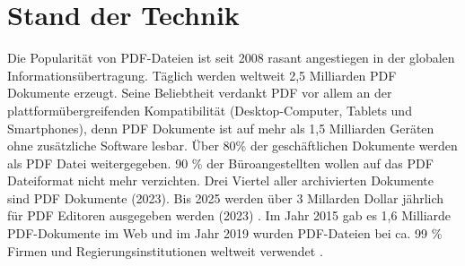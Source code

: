 \chapter{Stand der Technik}
Die Popularität von PDF-Dateien ist seit 2008 rasant angestiegen in der globalen Informationsübertragung. Täglich werden weltweit 2,5 Milliarden PDF Dokumente erzeugt. Seine Beliebtheit verdankt PDF vor allem an der plattformübergreifenden Kompatibilität (Desktop-Computer, Tablets und Smartphones), denn PDF Dokumente ist auf mehr als 1,5 Milliarden Geräten ohne zusätzliche Software lesbar. Über 80\% der geschäftlichen Dokumente werden als PDF Datei weitergegeben. \cite{formilo} 90 \% der Büroangestellten wollen auf das PDF Dateiformat nicht mehr verzichten. Drei Viertel aller archivierten Dokumente sind PDF Dokumente (2023).
Bis 2025 werden über 3 Millarden Dollar jährlich für PDF Editoren ausgegeben werden (2023) \cite{kofax}. Im Jahr 2015 gab es 1,6 Milliarde PDF-Dokumente im Web und im Jahr 2019 wurden PDF-Dateien bei ca. 99 \% Firmen und Regierungsinstitutionen weltweit verwendet \cite{ccc-break-pdf}. \\

